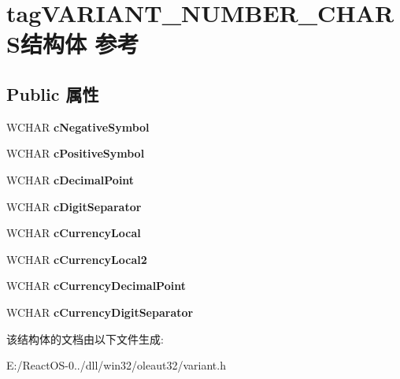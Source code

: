 \hypertarget{structtag_v_a_r_i_a_n_t___n_u_m_b_e_r___c_h_a_r_s}{}\section{tag\+V\+A\+R\+I\+A\+N\+T\+\_\+\+N\+U\+M\+B\+E\+R\+\_\+\+C\+H\+A\+R\+S结构体 参考}
\label{structtag_v_a_r_i_a_n_t___n_u_m_b_e_r___c_h_a_r_s}
\subsection*{Public 属性}
\begin{DoxyCompactItemize}
\item 
\mbox{\label{structtag_v_a_r_i_a_n_t___n_u_m_b_e_r___c_h_a_r_s_aba80c59452e4280773693b63bec64d3b}} 
W\+C\+H\+AR {\bfseries c\+Negative\+Symbol}
\item 
\mbox{\label{structtag_v_a_r_i_a_n_t___n_u_m_b_e_r___c_h_a_r_s_adcec955feb5cbf45edb4082b940633fc}} 
W\+C\+H\+AR {\bfseries c\+Positive\+Symbol}
\item 
\mbox{\label{structtag_v_a_r_i_a_n_t___n_u_m_b_e_r___c_h_a_r_s_a0576cdbc73aa274463ab6bc1dd07c707}} 
W\+C\+H\+AR {\bfseries c\+Decimal\+Point}
\item 
\mbox{\label{structtag_v_a_r_i_a_n_t___n_u_m_b_e_r___c_h_a_r_s_a48475616699d36d436a615888f5811fb}} 
W\+C\+H\+AR {\bfseries c\+Digit\+Separator}
\item 
\mbox{\label{structtag_v_a_r_i_a_n_t___n_u_m_b_e_r___c_h_a_r_s_ac07e9f4a77cb86301980f2440d4c6436}} 
W\+C\+H\+AR {\bfseries c\+Currency\+Local}
\item 
\mbox{\label{structtag_v_a_r_i_a_n_t___n_u_m_b_e_r___c_h_a_r_s_a160ff88a3793f52f7b3f4bcd6ab654fd}} 
W\+C\+H\+AR {\bfseries c\+Currency\+Local2}
\item 
\mbox{\label{structtag_v_a_r_i_a_n_t___n_u_m_b_e_r___c_h_a_r_s_a9237bd8ef07523344d00595451e5c289}} 
W\+C\+H\+AR {\bfseries c\+Currency\+Decimal\+Point}
\item 
\mbox{\label{structtag_v_a_r_i_a_n_t___n_u_m_b_e_r___c_h_a_r_s_a6c2be365f5d69d2f4d32bfdb974381a2}} 
W\+C\+H\+AR {\bfseries c\+Currency\+Digit\+Separator}
\end{DoxyCompactItemize}


该结构体的文档由以下文件生成\+:\begin{DoxyCompactItemize}
\item 
E\+:/\+React\+O\+S-\/0../dll/win32/oleaut32/variant.\+h\end{DoxyCompactItemize}
